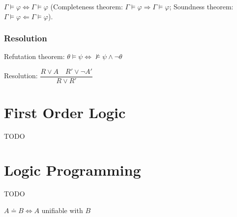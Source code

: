 \documentclass[]{article}
\begin{document}
\noindent $\Gamma \models \varphi \iff \Gamma \models \varphi$ (Completeness theorem: $\Gamma \models \varphi \Rightarrow \Gamma \models \varphi$; Soundness theorem: $\Gamma \models \varphi \Leftarrow \Gamma \models \varphi$).

\subsubsection{Resolution}

\noindent Refutation theorem: $\theta \models \psi \iff \not\models \psi \land \neg\theta$

\noindent Resolution: $\dfrac{R \lor A \hspace{1em} R' \lor \neg A'}{R \lor R'}$

\section{First Order Logic}

TODO

\section{Logic Programming}

TODO

$ A \doteq B \Leftrightarrow A $ unifiable with $ B $
\end{document}
